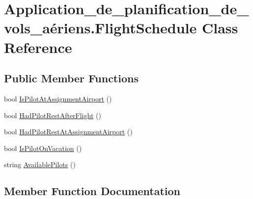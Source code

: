 \hypertarget{class_application__de__planification__de__vols__a_xC3_xA9riens_1_1_flight_schedule}{}\section{Application\+\_\+de\+\_\+planification\+\_\+de\+\_\+vols\+\_\+aériens.\+Flight\+Schedule Class Reference}
\label{class_application__de__planification__de__vols__a_xC3_xA9riens_1_1_flight_schedule}
\subsection*{Public Member Functions}
\begin{DoxyCompactItemize}
\item 
bool \hyperlink{class_application__de__planification__de__vols__a_xC3_xA9riens_1_1_flight_schedule_a8ef6efe5d4556c6793decc03999c6692}{Is\+Pilot\+At\+Assignment\+Airport} ()
\item 
bool \hyperlink{class_application__de__planification__de__vols__a_xC3_xA9riens_1_1_flight_schedule_a6d77a7580a5739ce096a6957151608c8}{Had\+Pilot\+Rest\+After\+Flight} ()
\item 
bool \hyperlink{class_application__de__planification__de__vols__a_xC3_xA9riens_1_1_flight_schedule_ae27d90bab7a6611c9e9dbfe9dfbb232d}{Had\+Pilot\+Rest\+At\+Assignment\+Airport} ()
\item 
bool \hyperlink{class_application__de__planification__de__vols__a_xC3_xA9riens_1_1_flight_schedule_a4174bcccae04883b180939a7be091d6c}{Is\+Pilot\+On\+Vacation} ()
\item 
string \hyperlink{class_application__de__planification__de__vols__a_xC3_xA9riens_1_1_flight_schedule_aed4503f404e7ce97ee627676ce6340e2}{Available\+Pilots} ()
\end{DoxyCompactItemize}


\subsection{Member Function Documentation}
\mbox{\label{class_application__de__planification__de__vols__a_xC3_xA9riens_1_1_flight_schedule_aed4503f404e7ce97ee627676ce6340e2}} 
